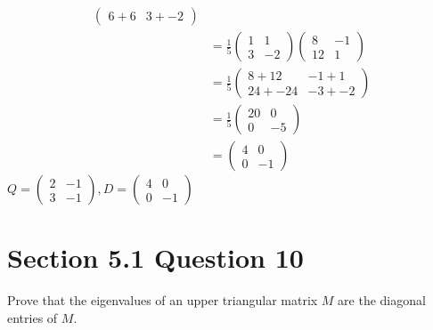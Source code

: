\documentclass[13pt]{article}
\begin{document}
\begin{enumerate}[label=(\alph*),leftmargin=*]
\begin{enumerate}[label=(\roman*),leftmargin=*]
\begin{align*}
\begin{pmatrix}
              6 + 6 & 3 + -2
            \end{pmatrix} \\
          &= \frac{1}{5}
            \begin{pmatrix}
              1 & 1 \\
              3 & -2
            \end{pmatrix}
            \begin{pmatrix}
              8 & -1 \\
              12 & 1
            \end{pmatrix} \\
          &= \frac{1}{5}
            \begin{pmatrix}
              8 + 12 & -1 + 1 \\
              24 + -24 & -3 + -2
            \end{pmatrix} \\
          &= \frac{1}{5}
            \begin{pmatrix}
              20 & 0 \\
              0 & -5
            \end{pmatrix} \\
          &=
            \begin{pmatrix}
              4 & 0 \\
              0 & -1
            \end{pmatrix}
      \end{align*}
      $Q =
      \begin{pmatrix}
        2 & -1 \\
        3 & -1
      \end{pmatrix}, D =
      \begin{pmatrix}
        4 & 0 \\
        0 & -1
      \end{pmatrix}
      $
    \end{enumerate}
    
    \newpage
    \section*{Section 5.1 Question 10}
    Prove that the eigenvalues of an upper triangular matrix $M$ are the diagonal entries of $M$.

\end{enumerate}
\end{document}
